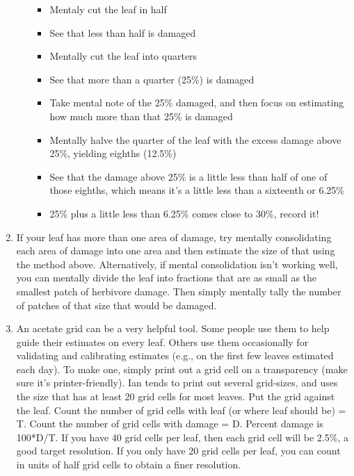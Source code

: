 \documentclass[
  letterpaper,
  oneside,
  open=any]{scrbook}
\providecommand{\tightlist}{%
  \setlength{\itemsep}{0pt}\setlength{\parskip}{0pt}}\usepackage{longtable,booktabs,array}
\begin{document}
\begin{enumerate}
\begin{itemize}
    \begin{itemize}
    \tightlist
    \item
      Mentaly cut the leaf in half
    \item
      See that less than half is damaged
    \item
      Mentally cut the leaf into quarters
    \item
      See that more than a quarter (25\%) is damaged
    \item
      Take mental note of the 25\% damaged, and then focus on estimating
      how much more than that 25\% is damaged
    \item
      Mentally halve the quarter of the leaf with the excess damage
      above 25\%, yielding eighths (12.5\%)
    \item
      See that the damage above 25\% is a little less than half of one
      of those eighths, which means it's a little less than a sixteenth
      or 6.25\%
    \item
      25\% plus a little less than 6.25\% comes close to 30\%, record
      it!
    \end{itemize}
  \end{itemize}
\item
  If your leaf has more than one area of damage, try mentally
  consolidating each area of damage into one area and then estimate the
  size of that using the method above. Alternatively, if mental
  consolidation isn't working well, you can mentally divide the leaf
  into fractions that are as small as the smallest patch of herbivore
  damage. Then simply mentally tally the number of patches of that size
  that would be damaged.
\item
  An acetate grid can be a very helpful tool. Some people use them to
  help guide their estimates on every leaf. Others use them occasionally
  for validating and calibrating estimates (e.g., on the first few
  leaves estimated each day). To make one, simply print out a grid cell
  on a transparency (make sure it's printer-friendly). Ian tends to
  print out several grid-sizes, and uses the size that has at least 20
  grid cells for most leaves. Put the grid against the leaf. Count the
  number of grid cells with leaf (or where leaf should be) = T. Count
  the number of grid cells with damage = D. Percent damage is 100*D/T.
  If you have 40 grid cells per leaf, then each grid cell will be 2.5\%,
  a good target resolution. If you only have 20 grid cells per leaf, you
  can count in units of half grid cells to obtain a finer resolution.

\end{enumerate}
\end{document}
